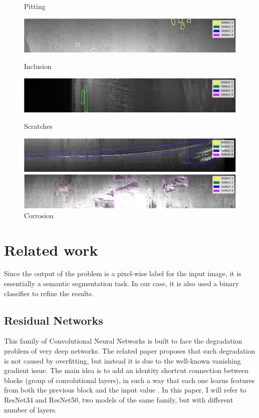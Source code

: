 \documentclass[10pt,twocolumn,letterpaper]{article}
\begin{document}
   \begin{figure}[h]
      \centering
      \caption{Pitting} \label{fig:defect1}
      \includegraphics[scale=0.3]{Img_Defect1}
      \caption{Inclusion} \label{fig:defect2}
      \includegraphics[scale=0.3]{Img_Defect2}
      \caption{Scratches} \label{fig:defect3}
      \includegraphics[scale=0.3]{Img_Defect3}
      \caption{Corrosion} \label{fig:defect4}
      \includegraphics[scale=0.3]{Img_Defect4}
   \end{figure}


\section{Related work}
   Since the output of the problem is a pixel-wise label for the input image, it is essentially a semantic segmentation task. In our case, it is also used a binary classifier to refine the results.
   \subsection{Residual Networks} 
      This family of Convolutional Neural Networks is built to face the degradation problem of very deep networks. The related paper proposes that such degradation is not caused by overfitting, but instead it is due to the well-known vanishing gradient issue. The main idea is to add an identity shortcut connection between blocks (group of convolutional layers), in such a way that each one learns features from both the previous block and the input value \cite{resnet}.
      In this paper, I will refer to ResNet34 and ResNet50, two models of the same family, but with different number of layers.
\end{document}
